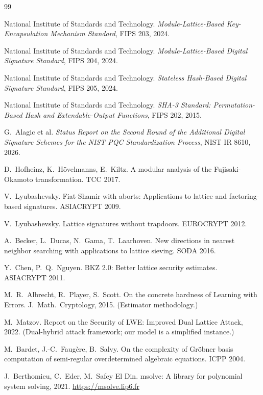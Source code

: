 \documentclass[11pt,a4paper]{article}
\begin{document}

\begin{thebibliography}{99}

 National Institute of Standards and Technology.
  \emph{Module-Lattice-Based Key-Encapsulation Mechanism Standard},
  FIPS 203, 2024.

 National Institute of Standards and Technology.
  \emph{Module-Lattice-Based Digital Signature Standard}, FIPS 204, 2024.

 National Institute of Standards and Technology.
  \emph{Stateless Hash-Based Digital Signature Standard}, FIPS 205, 2024.

 National Institute of Standards and Technology.
  \emph{SHA-3 Standard: Permutation-Based Hash and Extendable-Output
  Functions}, FIPS 202, 2015.

 G.~Alagic et al.
  \emph{Status Report on the Second Round of the Additional Digital
  Signature Schemes for the NIST PQC Standardization Process},
  NIST IR 8610, 2026.

 D.~Hofheinz, K.~H\"ovelmanns, E.~Kiltz.
  A modular analysis of the Fujisaki-Okamoto transformation.
  TCC 2017.

 V.~Lyubashevsky.
  Fiat-Shamir with aborts: Applications to lattice and factoring-based
  signatures. ASIACRYPT 2009.

 V.~Lyubashevsky.
  Lattice signatures without trapdoors. EUROCRYPT 2012.

 A.~Becker, L.~Ducas, N.~Gama, T.~Laarhoven.
  New directions in nearest neighbor searching with applications to lattice
  sieving. SODA 2016.

 Y.~Chen, P.~Q.~Nguyen.
  BKZ 2.0: Better lattice security estimates. ASIACRYPT 2011.

 M.~R.~Albrecht, R.~Player, S.~Scott.
  On the concrete hardness of Learning with Errors.
  J.~Math.~Cryptology, 2015. (Estimator methodology.)

 M.~Matzov.
  Report on the Security of LWE: Improved Dual Lattice Attack, 2022.
  (Dual-hybrid attack framework; our model is a simplified instance.)

 M.~Bardet, J.-C.~Faug\`ere, B.~Salvy.
  On the complexity of Gr\"obner basis computation of semi-regular
  overdetermined algebraic equations. ICPP 2004.

 J.~Berthomieu, C.~Eder, M.~Safey El Din.
  msolve: A library for polynomial system solving, 2021.
  \url{https://msolve.lip6.fr}


\end{thebibliography}
\end{document}
